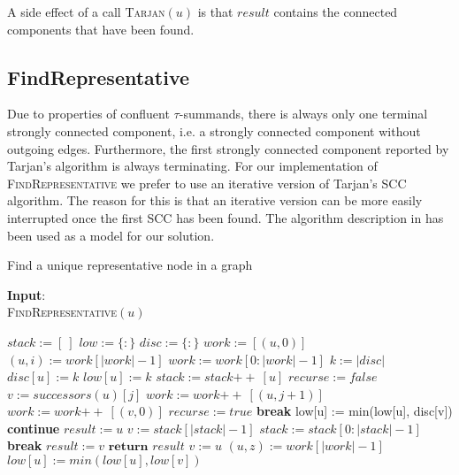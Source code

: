 \documentclass{article}
\newcommand{\concat}{\ensuremath{+\!\!+\:}}
\newcommand{\emptymap}{\ensuremath{\{ : \}}}
\newcommand{\emptylist}{\ensuremath{[\:]}}
\begin{document}
A side effect of a call \textsc{Tarjan}$(u)$ is that $result$ contains the connected components that have been found.

\subsection{FindRepresentative}
Due to properties of confluent $\tau$-summands, there is always only one terminal strongly connected component, i.e. a strongly connected component without outgoing edges. Furthermore, the first strongly connected component reported by Tarjan's algorithm is always terminating. For our implementation of \textsc{FindRepresentative} we prefer to use an iterative version of Tarjan's SCC algorithm. The reason for this is that an iterative version can be more easily interrupted once the first SCC has been found. The algorithm description in \cite{TarjanIterative} has been used as a model for our solution.

\begin{algorithm}
\small
\caption{Find a unique representative node in a graph}
\vspace*{1ex}
{\textbf{Input}:} \\
\textsc{FindRepresentative}$(u)$
\begin{algorithmic}[1]
\State $stack := \emptylist$
\State $low := \emptymap$
\State $disc := \emptymap$
\State $work := [(u, 0)]$
\While {$work \neq \emptylist$}
  \State $(u, i) := work[|work| - 1]$
  \State $work := work[0 : |work| - 1]$
  \EndIf
    \State $k := |disc|$
    \State $disc[u] := k$
    \State $low[u] := k$
    \State $stack := stack \concat [u]$
  \State $recurse := false$
  \EndFor
    \State $v := successors(u)[j]$
      \State $work := work \concat [(u, j+1)]$
      \State $work := work \concat [(v, 0)]$
      \State $recurse := true$
      \State \textbf{break}
      \State low[u] := min(low[u], disc[v])
    \EndIf
    \textbf{continue}
  \EndIf
    \State $result := u$
      \State $v := stack[|stack| - 1]$
      \State $stack := stack[0:|stack| - 1]$
        \State \textbf{break}
      \EndIf
        \State $result := v$
      \EndIf
    \EndWhile
    \State $\textbf{return } result$
  \EndIf
  \If {$work \neq \emptylist$}
    \State $v := u$
    \State $(u, z) := work[|work| - 1]$
    \State $low[u] := min(low[u], low[v])$
  \EndIf
\EndWhile
\end{algorithmic}
\end{algorithm}

\newpage


\end{document}
